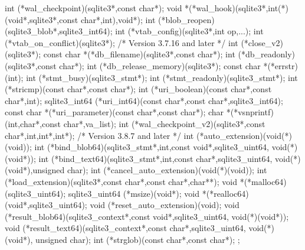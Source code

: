 \begin{Codex}[label=sqlite3ext.h,numbers=left]
{  int (*wal_checkpoint)(sqlite3*,const char*);
  void *(*wal_hook)(sqlite3*,int(*)(void*,sqlite3*,const char*,int),void*);
  int (*blob_reopen)(sqlite3_blob*,sqlite3_int64);
  int (*vtab_config)(sqlite3*,int op,...);
  int (*vtab_on_conflict)(sqlite3*);
  /* Version 3.7.16 and later */
  int (*close_v2)(sqlite3*);
  const char *(*db_filename)(sqlite3*,const char*);
  int (*db_readonly)(sqlite3*,const char*);
  int (*db_release_memory)(sqlite3*);
  const char *(*errstr)(int);
  int (*stmt_busy)(sqlite3_stmt*);
  int (*stmt_readonly)(sqlite3_stmt*);
  int (*stricmp)(const char*,const char*);
  int (*uri_boolean)(const char*,const char*,int);
  sqlite3_int64 (*uri_int64)(const char*,const char*,sqlite3_int64);
  const char *(*uri_parameter)(const char*,const char*);
  char *(*vsnprintf)(int,char*,const char*,va_list);
  int (*wal_checkpoint_v2)(sqlite3*,const char*,int,int*,int*);
  /* Version 3.8.7 and later */
  int (*auto_extension)(void(*)(void));
  int (*bind_blob64)(sqlite3_stmt*,int,const void*,sqlite3_uint64,
                     void(*)(void*));
  int (*bind_text64)(sqlite3_stmt*,int,const char*,sqlite3_uint64,
                      void(*)(void*),unsigned char);
  int (*cancel_auto_extension)(void(*)(void));
  int (*load_extension)(sqlite3*,const char*,const char*,char**);
  void *(*malloc64)(sqlite3_uint64);
  sqlite3_uint64 (*msize)(void*);
  void *(*realloc64)(void*,sqlite3_uint64);
  void (*reset_auto_extension)(void);
  void (*result_blob64)(sqlite3_context*,const void*,sqlite3_uint64,
                        void(*)(void*));
  void (*result_text64)(sqlite3_context*,const char*,sqlite3_uint64,
                         void(*)(void*), unsigned char);
  int (*strglob)(const char*,const char*);
};


\end{Codex}
